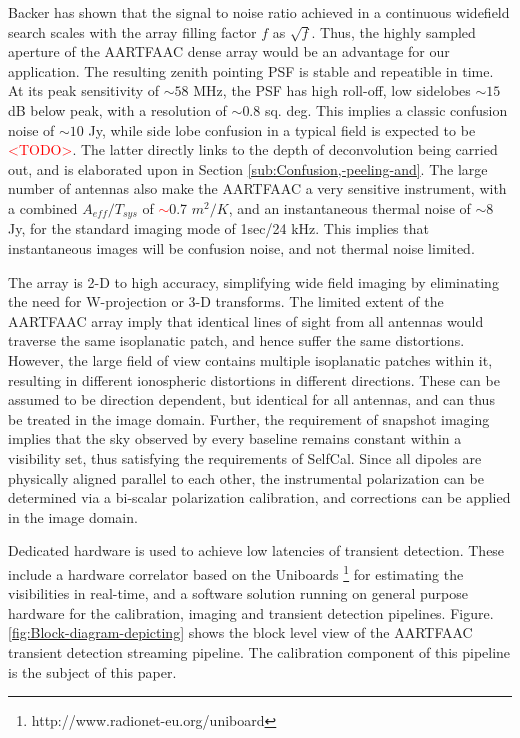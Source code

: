 \documentclass{aa}
\begin{document}
Backer \cite{backer1999pers} has shown that the signal to noise ratio
achieved in a continuous widefield search scales with the array filling
factor $f$ as $\sqrt{f}$. Thus, the highly sampled aperture of the
AARTFAAC dense array would be an advantage for our application. The
resulting zenith pointing PSF is stable and repeatible in time. At
its peak sensitivity of $\sim$$58$ MHz, the PSF has high roll-off,
low sidelobes $\sim$$15$ dB below peak, with a resolution of $\sim$$0.8$
sq. deg. This implies a classic confusion noise of $\sim$$10$ Jy,
while side	lobe confusion in a typical field is expected to be \textcolor{red}{<TODO>}.
The latter directly links to the depth of deconvolution being carried
out, and is elaborated upon in Section \ref{sub:Confusion,-peeling-and}.
The large number of antennas also make the AARTFAAC a very sensitive
instrument, with a combined $A_{eff}/T_{sys}$ of \textcolor{red}{$\sim$}0.7
$m^{2}/K$\cite{wijnholds2011situ}, and an instantaneous thermal
noise of $\sim$8 Jy, for the standard imaging mode of 1sec/24 kHz.
This implies that instantaneous images will be confusion noise, and
not thermal noise limited.

The array is 2-D to high accuracy, simplifying wide field imaging
by eliminating the need for W-projection or 3-D transforms. The limited
extent of the AARTFAAC array imply that identical lines of sight from
all antennas would traverse the same isoplanatic patch, and hence
suffer the same distortions. However, the large field of view contains
multiple isoplanatic patches within it, resulting in different ionospheric
distortions in different directions. These can be assumed to be direction
dependent, but identical for all antennas, and can thus be treated
in the image domain. Further, the requirement of snapshot imaging
implies that the sky observed by every baseline remains constant within
a visibility set, thus satisfying the requirements of SelfCal. Since
all dipoles are physically aligned parallel to each other, the instrumental
polarization can be determined via a bi-scalar polarization calibration,
and corrections can be applied in the image domain.

Dedicated hardware is used to achieve low latencies of transient detection.
These include a hardware correlator based on the Uniboards%
\footnote{http://www.radionet-eu.org/uniboard%
} for estimating the visibilities in real-time, and a software solution
running on general purpose hardware for the calibration, imaging and
transient detection pipelines. Figure. \ref{fig:Block-diagram-depicting}
shows the block level view of the AARTFAAC transient detection streaming
pipeline. The calibration component of this pipeline is the subject
of this paper.
\end{document}
